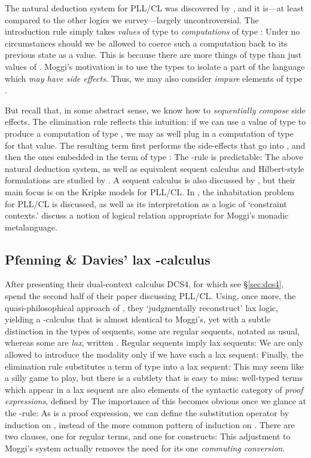 \documentclass[a4paper]{amsart}
\begin{document}
The natural deduction system for \textsf{PLL/CL} was discovered by
\cite{Moggi1989, Moggi1991}, and it is---at least compared to the other
logics we survey---largely uncontroversial. The introduction
rule simply takes \emph{values} of type  to \emph{computations}
of type :  Under no circumstances should we be allowed to
coerce such a computation back to its previous state as a value.
This is because there are more things of type  than
just values of . Moggi's motivation is to use the 
types to isolate a part of the language which \emph{may have side
effects}. Thus, we may also consider \emph{impure} elements of
type .

But recall that, in some abstract sense, we know how to
\emph{sequentially compose} side effects. The elimination rule
reflects this intuition: if we can use a value of type  to
produce a computation of type , we may as well plug in
a computation of type  for that value. The resulting
term first performs the side-effects that go into ,
and then the ones embedded in the term of type :  The -rule is predictable:  The above natural deduction system, as well as equivalent
sequent calculus and Hilbert-style formulations are studied by
\cite{Benton1998}. A sequent calculus is also discussed by
\cite{Fairtlough1997}, but their main focus is on the Kripke
models for \textsf{PLL/CL}. In \citep{Fairtlough2002}, the
inhabitation problem for \textsf{PLL/CL} is discussed, as well as
its interpretation as a logic of `constraint contexts.'
\cite{Goubault-Larrecq2008} discuss a notion of logical relation
appropriate for Moggi's monadic metalanguage.

\subsection{Pfenning \& Davies' lax -calculus}
  \label{sec:laxlambda}

After presenting their dual-context calculus \textsf{DCS4}, for
which see \S \ref{sec:dcs4}, \cite{Davies2001} spend the second
half of their paper discussing
\textsf{PLL/CL}. Using, once more, the quasi-philosophical
approach of \cite{Martin-Lof1996}, they `judgmentally reconstruct'
lax logic, yielding a -calculus that is almost identical
to Moggi's, yet with a subtle distinction in the types of
sequents, some are regular sequents, notated as usual, whereas
some are \emph{lax}, written .
Regular sequents imply lax sequents:  We are only allowed to introduce the modality
only if we have such a lax sequent:  Finally, the elimination rule substitutes a
term of type  into a lax sequent:  This may seem like a silly game to play, but there is a
subtlety that is easy to miss: well-typed terms  which appear
in a lax sequent  are also elements
of the syntactic category  of \emph{proof expressions}, defined
by  The importance of this becomes obvious once we glance at the
-rule:  As  is a proof expression, we can define the
substitution operator  by induction on
, instead of the more common pattern of induction on .
There are two clauses, one for regular terms, and one for
 constructs:  This adjustment to Moggi's system actually removes
the need for its one \emph{commuting conversion}.
\end{document}
